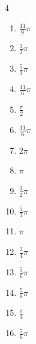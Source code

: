 \begin{multicols}{4}
\begin{enumerate}
  \item $\displaystyle \frac{11}{6}\pi$

  \item $\displaystyle \frac{3}{2}\pi$

  \item $\displaystyle \frac{5}{3}\pi$

  \item $\displaystyle \frac{11}{6}\pi$

  \item $\displaystyle \frac{\pi}{2}$

  \item $\displaystyle \frac{11}{6}\pi$

  \item $\displaystyle 2\pi$

  \item $\displaystyle \pi$

  \item $\displaystyle \frac{3}{2}\pi$

  \item $\displaystyle \frac{5}{3}\pi$

  \item $\displaystyle \pi$

  \item $\displaystyle \frac{3}{4}\pi$

  \item $\displaystyle \frac{5}{6}\pi$

  \item $\displaystyle \frac{5}{6}\pi$

  \item $\displaystyle \frac{\pi}{4}$

\columnbreak %

  \item $\displaystyle \frac{7}{6}\pi$


\end{enumerate}
\end{multicols}
